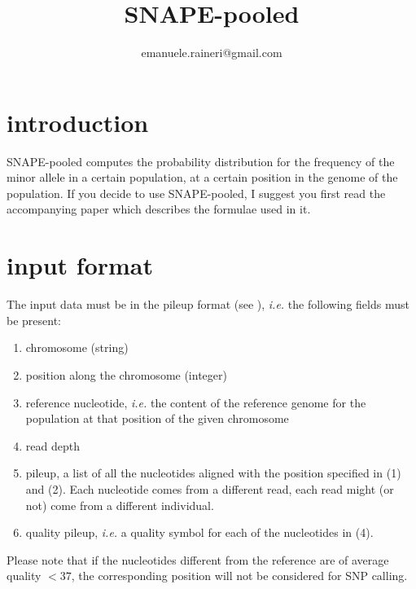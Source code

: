 \documentclass{report}
\newcommand{\tmem}[1]{{\em #1\/}}
\newenvironment{enumeratenumeric}{\begin{enumerate}[1.] }{\end{enumerate}}
\begin{document}
\title{SNAPE-pooled}\author{emanuele.raineri@gmail.com}
\maketitle

\section{introduction}

SNAPE-pooled computes the probability distribution for the frequency of the
minor allele in a certain population, at a certain position in the genome of
the population. If you decide to use SNAPE-pooled, I suggest you first read the
accompanying paper which describes the formulae used in it.

\section{input format}

The input data must be in the pileup format 
(see {\color{blue}{http://samtools.sourceforge.net/pileup.shtml}}),
{\tmem{i.e.}} the following fields must be present:


\begin{enumeratenumeric}
  \item chromosome (string) 
  
  \item position along the chromosome (integer)
  
  \item reference nucleotide, {\tmem{i.e.}} the content of the reference
  genome for the population at that position of the given chromosome
  
  \item read depth
  
  \item pileup, a list of all the nucleotides aligned with the position
  specified in (1) and (2). Each nucleotide comes from a different read, each
  read might (or not) come from a different individual.
  
  \item quality pileup, {\tmem{i.e.}}  a quality symbol for each of the
  nucleotides in (4).
  
  
\end{enumeratenumeric}


Please note that if the nucleotides different from the reference are of average quality $<37$,
the corresponding position will not be considered for SNP calling.
\end{document}
